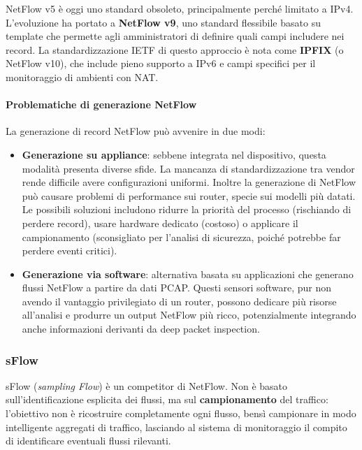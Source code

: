 NetFlow v5 è oggi uno standard obsoleto, principalmente perché limitato a IPv4.
L'evoluzione ha portato a \textbf{NetFlow v9}, uno standard flessibile basato
su template che permette agli amministratori di definire quali campi includere
nei record. La standardizzazione IETF di questo approccio è nota come
\textbf{IPFIX} (o NetFlow v10), che include pieno supporto a IPv6 e campi
specifici per il monitoraggio di ambienti con NAT.

\paragraph{Problematiche di generazione NetFlow}

La generazione di record NetFlow può avvenire in due modi:

\begin{itemize}
\item \textbf{Generazione su appliance}: sebbene integrata nel dispositivo,
questa modalità presenta diverse sfide. La mancanza di standardizzazione
tra vendor rende difficile avere configurazioni uniformi. Inoltre la
generazione di NetFlow può causare problemi di performance sui router,
specie sui modelli più datati. Le possibili soluzioni includono ridurre
la priorità del processo (rischiando di perdere record), usare hardware
dedicato (costoso) o applicare il campionamento (sconsigliato per l'analisi
di sicurezza, poiché potrebbe far perdere eventi critici).
\item \textbf{Generazione via software}: alternativa basata su applicazioni
che generano flussi NetFlow a partire da dati PCAP. Questi sensori software,
pur non avendo il vantaggio privilegiato di un router, possono dedicare più
risorse all'analisi e produrre un output NetFlow più ricco, potenzialmente
integrando anche informazioni derivanti da deep packet inspection.
\end{itemize}

\subsubsection{sFlow}

sFlow (\textit{sampling Flow}) è un competitor di NetFlow. Non è basato
sull'identificazione esplicita dei flussi, ma sul \textbf{campionamento}
del traffico: l'obiettivo non è ricostruire completamente ogni flusso,
bensì campionare in modo intelligente aggregati di traffico, lasciando al
sistema di monitoraggio il compito di identificare eventuali flussi rilevanti.

